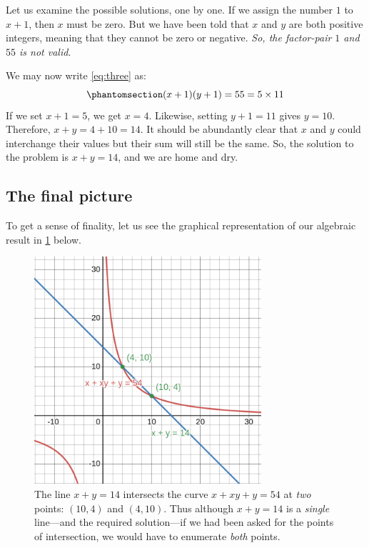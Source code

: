\documentclass[
  a4paper,
]{article}
\begin{document}
Let us examine the possible solutions, one by one. If we assign the
number \(1\) to \(x + 1\), then \(x\) must be zero. But we have been
told that \(x\) and \(y\) are both positive integers, meaning that they
cannot be zero or negative. \emph{So, the factor-pair \(1\) and \(55\)
is not valid}.

We may now write \cref{eq:three} as:
\begin{equation}\phantomsection\label{eq:solution}{
(x+1)(y+1) = 55 = 5\times 11
}\end{equation} If we set \(x + 1 = 5\), we get \(x = 4\). Likewise,
setting \(y + 1 = 11\) gives \(y = 10\). Therefore,
\(x + y = 4 + 10 = 14\). It should be abundantly clear that \(x\) and
\(y\) could interchange their values but their sum will still be the
same. So, the solution to the problem is \(x + y = 14\), and we are home
and dry.

\subsection{The final picture}\label{the-final-picture}

To get a sense of finality, let us see the graphical representation of
our algebraic result in \cref{fig:four} below.

\begin{figure}
\centering
\includegraphics[width=0.75\textwidth,height=\textheight]{images/olympiad-four.png}
\caption{The line \(x + y = 14\) intersects the curve \(x + xy +y = 54\)
at \emph{two} points: \((10, 4)\) and \((4, 10)\). Thus although
\(x + y = 14\) is a \emph{single} line---and the required solution---if
we had been asked for the points of intersection, we would have to
enumerate \emph{both} points.}\label{fig:four}
\end{figure}
\end{document}
